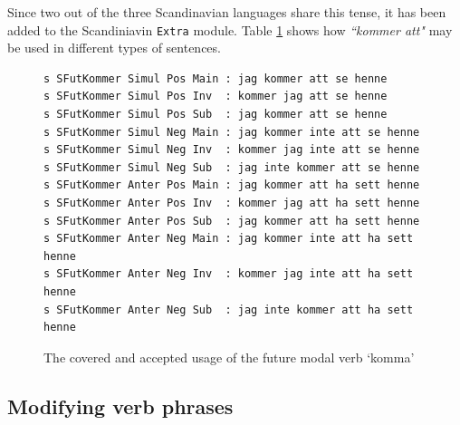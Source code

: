 \documentclass{report}
\begin{document}
Since two out of the three Scandinavian languages share this
tense, it has been added to the Scandiniavin \verb-Extra- module.
Table \ref{fig:kommeratt} shows how \emph{``kommer att"} may be used in different
types of sentences.
\begin{figure}[h]
\begin{verbatim}
s SFutKommer Simul Pos Main : jag kommer att se henne
s SFutKommer Simul Pos Inv  : kommer jag att se henne
s SFutKommer Simul Pos Sub  : jag kommer att se henne
s SFutKommer Simul Neg Main : jag kommer inte att se henne
s SFutKommer Simul Neg Inv  : kommer jag inte att se henne
s SFutKommer Simul Neg Sub  : jag inte kommer att se henne
s SFutKommer Anter Pos Main : jag kommer att ha sett henne
s SFutKommer Anter Pos Inv  : kommer jag att ha sett henne
s SFutKommer Anter Pos Sub  : jag kommer att ha sett henne
s SFutKommer Anter Neg Main : jag kommer inte att ha sett henne
s SFutKommer Anter Neg Inv  : kommer jag inte att ha sett henne
s SFutKommer Anter Neg Sub  : jag inte kommer att ha sett henne
\end{verbatim}
\caption{The covered and accepted usage of the future modal verb `komma'}
  \label{fig:kommeratt}
\end{figure}

%
\subsection{Modifying verb phrases}
\end{document}
